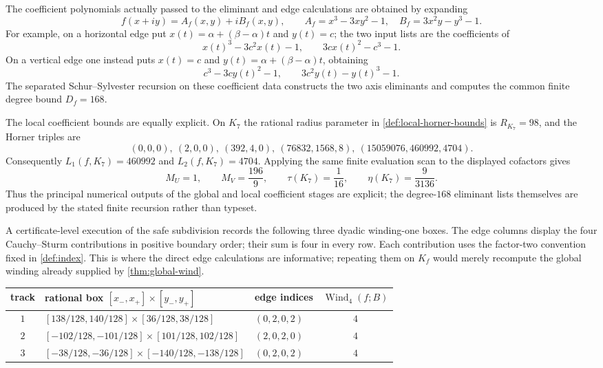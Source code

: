\documentclass[11pt]{article}
\newcommand{\Wind}{\operatorname{Wind}}
\begin{document}
The coefficient polynomials actually passed to the eliminant and edge
calculations are obtained by expanding
\[
 f(x+iy)=A_f(x,y)+iB_f(x,y),
 \qquad
 A_f=x^3-3xy^2-1,\quad B_f=3x^2y-y^3-1.
\]
For example, on a horizontal edge put
$x(t)=\alpha+(\beta-\alpha)t$ and $y(t)=c$; the two input lists are the
coefficients of
\[
 x(t)^3-3c^2x(t)-1,
 \qquad
 3c x(t)^2-c^3-1.
\]
On a vertical edge one instead puts $x(t)=c$ and
$y(t)=\alpha+(\beta-\alpha)t$, obtaining
\[
 c^3-3c y(t)^2-1,
 \qquad
 3c^2y(t)-y(t)^3-1.
\]
The separated Schur--Sylvester recursion on these coefficient data constructs
the two axis eliminants and computes the common finite degree bound
$D_f=168$.

The local coefficient bounds are equally explicit.  On $K_7$ the rational
radius parameter in \cref{def:local-horner-bounds} is $R_{K_7}=98$, and the
Horner triples are
\[
 (0,0,0),\ (2,0,0),\ (392,4,0),\ (76832,1568,8),\
 (15059076,460992,4704).
\]
Consequently $L_1(f,K_7)=460992$ and $L_2(f,K_7)=4704$.  Applying the same
finite evaluation scan to the displayed cofactors gives
\[
 M_U=1,\qquad M_V=\frac{196}{9},\qquad
 \tau(K_7)=\frac1{16},\qquad \eta(K_7)=\frac9{3136}.
\]
Thus the principal numerical outputs of the global and local coefficient
stages are explicit; the degree-$168$ eliminant lists themselves are produced
by the stated finite recursion rather than typeset.

A certificate-level execution of the safe subdivision records the following
three dyadic winding-one boxes.  The edge columns display the four
Cauchy--Sturm contributions in positive boundary order; their sum is four in
every row.  Each contribution uses the factor-two convention fixed in
\cref{def:index}.  This is where the direct edge calculations are informative;
repeating them on $K_f$ would merely recompute the global winding already
supplied by \cref{thm:global-wind}.

\begin{center}
\begin{tabularx}{\textwidth}{@{}cXlc@{}}
\toprule
track & rational box $[x_-,x_+]\times[y_-,y_+]$ & edge indices & $\Wind_4(f;B)$\\
\midrule
$1$ & $[138/128,140/128]\times[36/128,38/128]$ & $(0,2,0,2)$ & $4$\\
$2$ & $[-102/128,-101/128]\times[101/128,102/128]$ & $(2,0,2,0)$ & $4$\\
$3$ & $[-38/128,-36/128]\times[-140/128,-138/128]$ & $(0,2,0,2)$ & $4$\\
\bottomrule
\end{tabularx}
\end{center}
\end{document}
